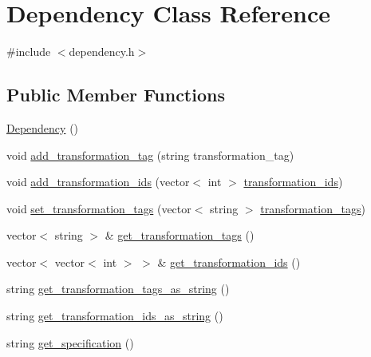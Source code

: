 \hypertarget{classDependency}{}\section{Dependency Class Reference}
\label{classDependency}


{\ttfamily \#include $<$dependency.\+h$>$}

\subsection*{Public Member Functions}
\begin{DoxyCompactItemize}
\item 
\hyperlink{classDependency_aa92957076c5000d1d3a56073302f1a41}{Dependency} ()
\item 
void \hyperlink{classDependency_a2436d5c4e0363832d2f81163467de426}{add\+\_\+transformation\+\_\+tag} (string transformation\+\_\+tag)
\item 
void \hyperlink{classDependency_aba3c43b4eb1e2429143cf297122f92ef}{add\+\_\+transformation\+\_\+ids} (vector$<$ int $>$ \hyperlink{classDependency_a357743c29d1e50ea6a06f0d89e4fa58c}{transformation\+\_\+ids})
\item 
void \hyperlink{classDependency_ac942f51b05df8875957b99ce74b9baec}{set\+\_\+transformation\+\_\+tags} (vector$<$ string $>$ \hyperlink{classDependency_a080b8391c054aaf43a7a6dfa9d57e125}{transformation\+\_\+tags})
\item 
vector$<$ string $>$ \& \hyperlink{classDependency_a89bbac105889b8fcf84a32f731a3a0b8}{get\+\_\+transformation\+\_\+tags} ()
\item 
vector$<$ vector$<$ int $>$ $>$ \& \hyperlink{classDependency_a9854eb2da947e302cefa36d25a880208}{get\+\_\+transformation\+\_\+ids} ()
\item 
string \hyperlink{classDependency_a158cbadc3e5d8a2a062a0f70c130821f}{get\+\_\+transformation\+\_\+tags\+\_\+as\+\_\+string} ()
\item 
string \hyperlink{classDependency_ab83b7f76991bb3f0ae6a42631002c8f4}{get\+\_\+transformation\+\_\+ids\+\_\+as\+\_\+string} ()
\item 
string \hyperlink{classDependency_adbff6153e89ab5a4143ee4f139a6f43a}{get\+\_\+specification} ()
\end{DoxyCompactItemize}
